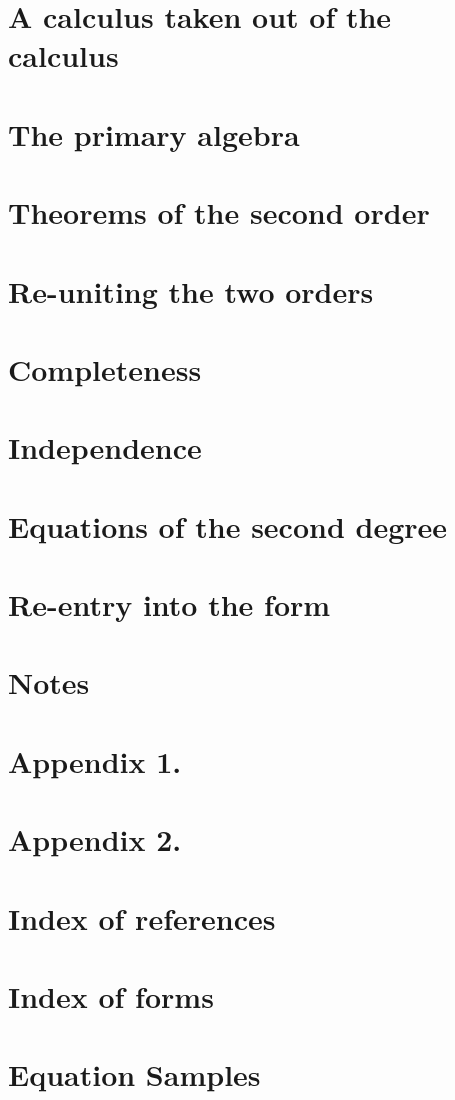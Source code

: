 \documentclass[a4paper]{article}
\theoremstyle{remark}
\begin{document}
\section{A calculus taken out of the calculus}
\section{The primary algebra}
\section{Theorems of the second order}
\section{Re-uniting the two orders}
\section{Completeness}
\section{Independence}
\section{Equations of the second degree}
\section{Re-entry into the form}
\section*{Notes }
\section*{Appendix 1. }
\section*{Appendix 2. }
\section*{Index of references}
\section*{Index of forms}

\section*{Equation Samples}
\newpage
\end{document}
